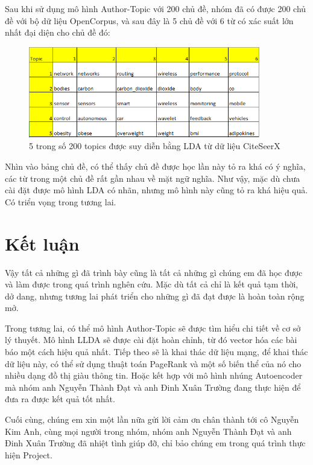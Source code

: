\documentclass[12pt,a4paper]{article}
\begin{document}
Sau khi sử dụng mô hình Author-Topic với 200 chủ đề, nhóm đã có được 200 chủ đề với bộ dữ liệu OpenCorpus, và sau đây là 5 chủ đề với 6 từ có xác suất lớn nhất đại diện cho chủ đề đó:

\begin{figure}[h]
    \centering
    \captionsetup{justification=centering}
    \includegraphics[width=0.9\textwidth]{author_topic}
    \caption{5 trong số 200 topics được suy diễn bằng LDA từ dữ liệu CiteSeerX}
    \label{fig:author_topic}
\end{figure}

\noindent
Nhìn vào bảng chủ đề, có thể thấy chủ đề được học lần này tỏ ra khá có ý nghĩa, các từ trong một chủ đề rất gần nhau về mặt ngữ nghĩa. Như vậy, mặc dù chưa cài đặt được mô hình LDA có nhãn, nhưng mô hình này cũng tỏ ra khá hiệu quả. Có triển vọng trong tương lai.


\newpage
\section{Kết luận}
Vậy tất cả những gì đã trình bày cũng là tất cả những gì chúng em đã học được và làm được trong quá trình nghên cứu. Mặc dù tất cả chỉ là kết quả tạm thời, dở dang, nhưng tương lai phát triển cho những gì đã đạt được là hoàn toàn rộng mở. 


Trong tương lai, có thể mô hình Author-Topic sẽ được tìm hiểu chi tiết về cơ sở lý thuyết. Mô hình LLDA sẽ được cài đặt hoàn chỉnh, từ đó vector hóa các bài báo một cách hiệu quả nhất. Tiếp theo sẽ là khai thác dữ liệu mạng, để khai thác dữ liệu này, có thể sử dụng thuật toán PageRank và một số biến thể của nó cho nhiều dạng đồ thị giàu thông tin. Hoặc kết hợp với mô hình nhúng Autoencoder mà nhóm anh Nguyễn Thành Đạt và anh Đinh Xuân Trường đang thực hiện để đưa ra được kết quả tốt nhất.


Cuối cùng, chúng em xin một lần nữa gửi lời cảm ơn chân thành tới cô Nguyễn Kim Anh, cùng mọi người trong nhóm, nhóm anh Nguyễn Thành Đạt và anh Đinh Xuân Trường đã nhiệt tình giúp đỡ, chỉ bảo chúng em trong quá trình thực hiện Project.
\end{document}
